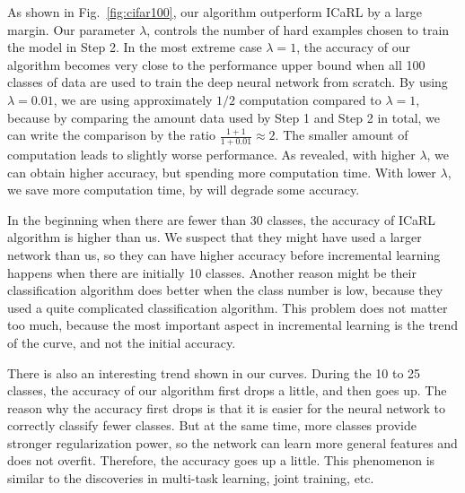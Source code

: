 As shown in Fig.~\ref{fig:cifar100}, our algorithm outperform ICaRL by a large margin. Our parameter $\lambda$, controls the number of hard examples chosen to train the model in Step 2. In the most extreme case $\lambda = 1$, the accuracy of our algorithm becomes very close to the performance upper bound when all 100 classes of data are used to train the deep neural network from scratch. By using $\lambda=0.01$, we are using approximately $1/2$ computation compared to $\lambda=1$, because by comparing the amount data used by Step 1 and Step 2 in total, we can write the comparison by the ratio $\frac{1+1}{1+0.01} \approx 2$. The smaller amount of computation leads to slightly worse performance. As revealed, with higher $\lambda$, we can obtain higher accuracy, but spending more computation time. With lower $\lambda$, we save more computation time, by will degrade some accuracy.

In the beginning when there are fewer than 30 classes, the accuracy of ICaRL algorithm is higher than us. We suspect that they might have used a larger network than us, so they can have higher accuracy before incremental learning happens when there are initially 10 classes. Another reason might be their classification algorithm does better when the class number is low, because they used a quite complicated classification algorithm. This problem does not matter too much, because the most important aspect in incremental learning is the trend of the curve, and not the initial accuracy.

There is also an interesting trend shown in our curves. During the 10 to 25 classes, the accuracy of our algorithm first drops a little, and then goes up. The reason why the accuracy first drops is that it is easier for the neural network to correctly classify fewer classes. But at the same time, more classes provide stronger regularization power, so the network can learn more general features and does not overfit. Therefore, the accuracy goes up a little. This phenomenon is similar to the discoveries in multi-task learning, joint training, etc. 

